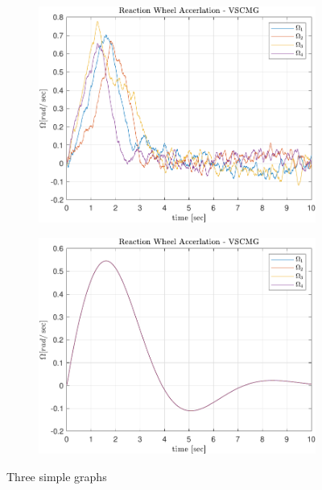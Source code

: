 \begin{figure}[ht]
     \centering
     \begin{subfigure}[b]{0.49\textwidth}
         \centering
         \includegraphics[width=\textwidth]{figures/plots/Results/vs-nn-Omg.pdf}
         \label{fig:y equals x}
     \end{subfigure}
     \begin{subfigure}[b]{0.49\textwidth}
         \centering
         \includegraphics[width=\textwidth]{figures/plots/Results/vs-vs-Omg.pdf}
         \label{fig:three sin x}
     \end{subfigure}
     
        \caption{Three simple graphs}
        \label{fig:three graphs}
\end{figure}

